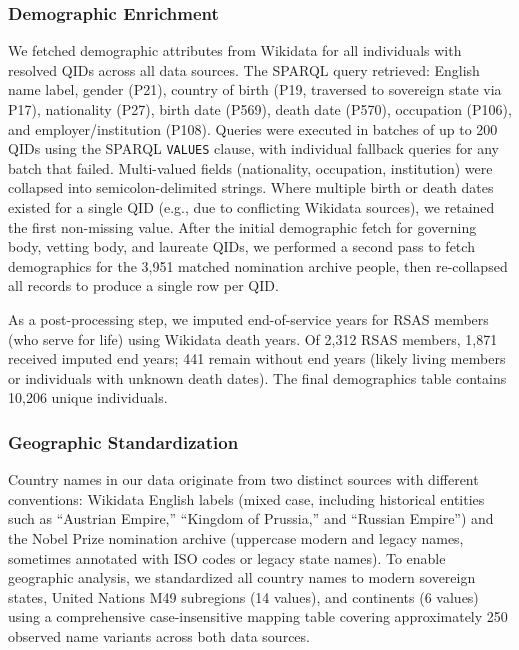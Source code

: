\documentclass[11pt]{article}
\begin{document}
\subsubsection{Demographic Enrichment}
\label{sec:data-demographics}

We fetched demographic attributes from Wikidata for all individuals with resolved QIDs across all data sources. The SPARQL query retrieved: English name label, gender (P21), country of birth (P19, traversed to sovereign state via P17), nationality (P27), birth date (P569), death date (P570), occupation (P106), and employer/institution (P108). Queries were executed in batches of up to 200 QIDs using the SPARQL \texttt{VALUES} clause, with individual fallback queries for any batch that failed. Multi-valued fields (nationality, occupation, institution) were collapsed into semicolon-delimited strings. Where multiple birth or death dates existed for a single QID (e.g., due to conflicting Wikidata sources), we retained the first non-missing value. After the initial demographic fetch for governing body, vetting body, and laureate QIDs, we performed a second pass to fetch demographics for the 3{,}951 matched nomination archive people, then re-collapsed all records to produce a single row per QID.

As a post-processing step, we imputed end-of-service years for RSAS members (who serve for life) using Wikidata death years. Of 2{,}312 RSAS members, 1{,}871 received imputed end years; 441 remain without end years (likely living members or individuals with unknown death dates). The final demographics table contains 10{,}206 unique individuals.

\subsubsection{Geographic Standardization}
\label{sec:data-geography}

Country names in our data originate from two distinct sources with different conventions: Wikidata English labels (mixed case, including historical entities such as ``Austrian Empire,'' ``Kingdom of Prussia,'' and ``Russian Empire'') and the Nobel Prize nomination archive (uppercase modern and legacy names, sometimes annotated with ISO codes or legacy state names). To enable geographic analysis, we standardized all country names to modern sovereign states, United Nations M49 subregions (14 values), and continents (6 values) using a comprehensive case-insensitive mapping table covering approximately 250 observed name variants across both data sources.
\end{document}
